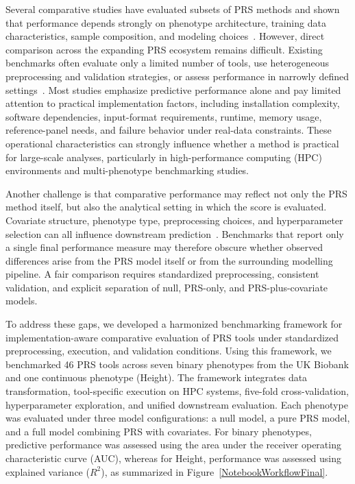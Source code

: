 \documentclass[pdflatex,sn-basic]{sn-jnl}
\begin{document}
Several comparative studies have evaluated subsets of PRS methods and shown that performance depends strongly on phenotype architecture, training data characteristics, sample composition, and modeling choices~\cite{Ma2021,Zhang_2021}. However, direct comparison across the expanding PRS ecosystem remains difficult. Existing benchmarks often evaluate only a limited number of tools, use heterogeneous preprocessing and validation strategies, or assess performance in narrowly defined settings~\cite{Ma2021,Zhang_2021}. Most studies emphasize predictive performance alone and pay limited attention to practical implementation factors, including installation complexity, software dependencies, input-format requirements, runtime, memory usage, reference-panel needs, and failure behavior under real-data constraints. These operational characteristics can strongly influence whether a method is practical for large-scale analyses, particularly in high-performance computing (HPC) environments and multi-phenotype benchmarking studies.

Another challenge is that comparative performance may reflect not only the PRS method itself, but also the analytical setting in which the score is evaluated. Covariate structure, phenotype type, preprocessing choices, and hyperparameter selection can all influence downstream prediction~\cite{Hui2023,Ma2021,Zhang_2021}. Benchmarks that report only a single final performance measure may therefore obscure whether observed differences arise from the PRS model itself or from the surrounding modelling pipeline. A fair comparison requires standardized preprocessing, consistent validation, and explicit separation of null, PRS-only, and PRS-plus-covariate models.

To address these gaps, we developed a harmonized benchmarking framework for implementation-aware comparative evaluation of PRS tools under standardized preprocessing, execution, and validation conditions. Using this framework, we benchmarked 46 PRS tools across seven binary phenotypes from the UK Biobank and one continuous phenotype (Height). The framework integrates data transformation, tool-specific execution on HPC systems, five-fold cross-validation, hyperparameter exploration, and unified downstream evaluation. Each phenotype was evaluated under three model configurations: a null model, a pure PRS model, and a full model combining PRS with covariates. For binary phenotypes, predictive performance was assessed using the area under the receiver operating characteristic curve (AUC), whereas for Height, performance was assessed using explained variance ($R^2$), as summarized in Figure~\ref{NotebookWorkflowFinal}.
\end{document}
